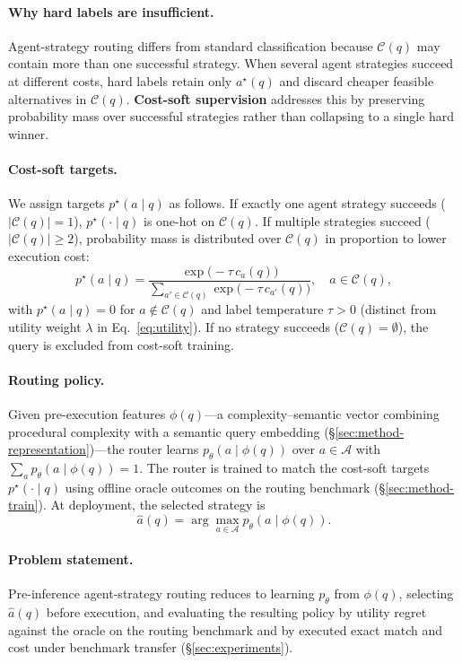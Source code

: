 \paragraph{Why hard labels are insufficient.}
Agent-strategy routing differs from standard classification because $\mathcal{C}(q)$ may contain
more than one successful strategy.
When several agent strategies succeed at different costs, hard labels retain only $a^\star(q)$
and discard cheaper feasible alternatives in $\mathcal{C}(q)$.
\textbf{Cost-soft supervision} addresses this by preserving probability mass over successful
strategies rather than collapsing to a single hard winner.

\paragraph{Cost-soft targets.}
We assign targets $p^\star(a\mid q)$ as follows.
If exactly one agent strategy succeeds ($|\mathcal{C}(q)|=1$), $p^\star(\cdot\mid q)$ is one-hot on
$\mathcal{C}(q)$.
If multiple strategies succeed ($|\mathcal{C}(q)|\ge 2$), probability mass is distributed over
$\mathcal{C}(q)$ in proportion to lower execution cost:
\begin{equation}
  p^\star(a\mid q)=
  \frac{\exp\bigl(-\tau\,c_a(q)\bigr)}
  {\sum_{a'\in\mathcal{C}(q)} \exp\bigl(-\tau\,c_{a'}(q)\bigr)},
  \quad a\in\mathcal{C}(q),
  \label{eq:cost-soft}
\end{equation}
with $p^\star(a\mid q)=0$ for $a\notin\mathcal{C}(q)$ and label temperature $\tau>0$
(distinct from utility weight $\lambda$ in Eq.~\ref{eq:utility}).
If no strategy succeeds ($\mathcal{C}(q)=\emptyset$), the query is excluded from cost-soft
training.

\paragraph{Routing policy.}
Given pre-execution features $\phi(q)$---a complexity--semantic vector combining procedural
complexity with a semantic query embedding (\S\ref{sec:method-representation})---the router
learns $p_\theta(a\mid\phi(q))$ over $a\in\mathcal{A}$ with $\sum_a p_\theta(a\mid\phi(q))=1$.
The router is trained to match the cost-soft targets $p^\star(\cdot\mid q)$ using offline oracle
outcomes on the routing benchmark (\S\ref{sec:method-train}).
At deployment, the selected strategy is
\begin{equation}
  \hat{a}(q)=\arg\max_{a\in\mathcal{A}} p_\theta(a\mid\phi(q)).
  \label{eq:argmax-route}
\end{equation}

\paragraph{Problem statement.}
Pre-inference agent-strategy routing reduces to learning $p_\theta$ from $\phi(q)$, selecting
$\hat{a}(q)$ before execution, and evaluating the resulting policy by utility regret against the
oracle on the routing benchmark and by executed exact match and cost under benchmark transfer
(\S\ref{sec:experiments}).

